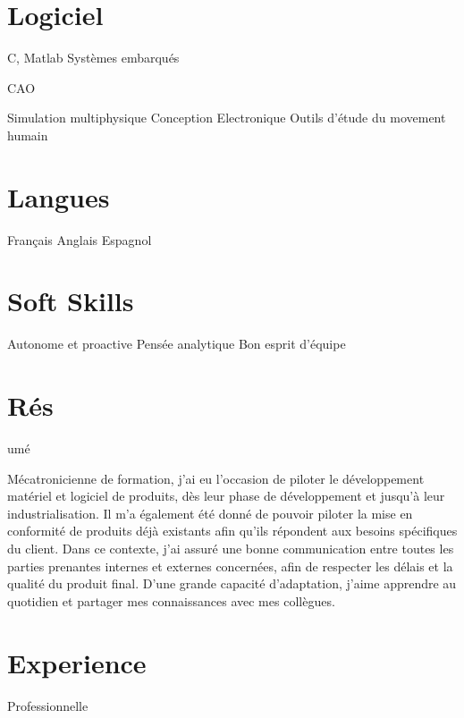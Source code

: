 \documentclass{cv-style}     %
\begin{document}
\begin{aside}
    \section{Logiciel}
    C, Matlab
    Systèmes embarqués %

    CAO %

    Simulation multiphysique %
    Conception Electronique %
    Outils d’étude du movement humain %
    \section{Langues}
    Français 
    Anglais 
    Espagnol
    \section{Soft Skills}
    Autonome et proactive
    Pensée analytique
    Bon esprit d'équipe
\end{aside}

\section{Rés}{umé}

Mécatronicienne de formation, j’ai eu l’occasion de piloter le développement matériel et logiciel de produits, 
dès leur phase de développement et jusqu'à leur industrialisation. Il m'a également été donné de pouvoir piloter la mise en conformité de produits 
déjà existants afin qu'ils répondent aux besoins spécifiques du client.
Dans ce contexte, j'ai assuré une bonne communication entre toutes les parties prenantes internes et externes concernées, 
afin de respecter les délais et la qualité du produit final.
D'une grande capacité d'adaptation, j’aime apprendre au quotidien et partager mes connaissances avec mes collègues.


\section{Experience}{ Professionnelle}
\end{document}

